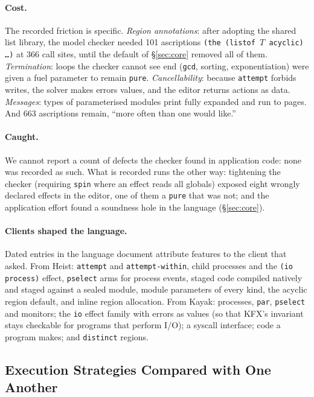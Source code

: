 \documentclass[acmsmall,screen,review]{acmart}
\newcommand{\cd}[1]{\texttt{#1}}
\begin{document}
\paragraph{Cost.} The recorded friction is specific. \emph{Region
annotations}: after adopting the shared list library, the model checker
needed 101 ascriptions \cd{(the (listof $T$ acyclic) \ldots)} at 366
call sites, until the default of \S\ref{sec:core} removed all of them.
\emph{Termination}: loops the checker cannot see end (\cd{gcd},
sorting, exponentiation) were given a fuel parameter to remain
\cd{pure}. \emph{Cancellability}: because \cd{attempt} forbids writes,
the solver makes errors values, and the editor returns actions as data.
\emph{Messages}: types of parameterised modules print fully expanded
and run to pages. And 663 ascriptions remain, ``more often than one
would like.''

\paragraph{Caught.} We cannot report a count of defects the checker
found in application code: none was recorded as such. What is recorded
runs the other way: tightening the checker (requiring \cd{spin} where
an effect reads all globals) exposed eight wrongly declared effects in
the editor, one of them a \cd{pure} that was not; and the application
effort found a soundness hole in the language (\S\ref{sec:core}).

\paragraph{Clients shaped the language.} Dated entries in the language
document attribute features to the client that asked. From Heist:
\cd{attempt} and \cd{attempt-within}, child processes and the
\cd{(io process)} effect, \cd{pselect} arms for process events, staged
code compiled natively and staged against a sealed module, module
parameters of every kind, the acyclic region default, and inline
region allocation. From Kayak: processes, \cd{par}, \cd{pselect} and
monitors; the \cd{io} effect family with errors as values (so that
KFX's invariant stays checkable for programs that perform I/O); a
syscall interface; code a program makes; and \cd{distinct} regions.

\subsection{Execution Strategies Compared with One Another}
\label{sec:perf}
\end{document}

